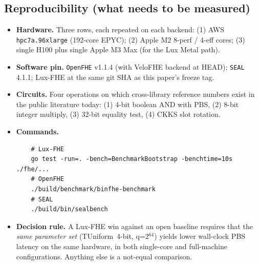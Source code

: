 \subsection{Reproducibility (what needs to be measured)}
\label{sec:fhe-repro}

\begin{itemize}[nosep]
  \item \textbf{Hardware.} Three rows, each repeated on each backend:
        (1) AWS \texttt{hpc7a.96xlarge} (192-core EPYC);
        (2) Apple M2 8-perf / 4-eff cores;
        (3) single H100 plus single Apple M3 Max (for the Lux Metal path).
  \item \textbf{Software pin.} \texttt{OpenFHE} v1.1.4 (with VeloFHE
        backend at HEAD); \texttt{SEAL} 4.1.1; Lux-FHE at the same
        git SHA as this paper's freeze tag.
  \item \textbf{Circuits.} Four operations on which cross-library
        reference numbers exist in the public literature today:
        (1) 4-bit boolean AND with PBS,
        (2) 8-bit integer multiply, (3) 32-bit equality test,
        (4) CKKS slot rotation.
  \item \textbf{Commands.}
  \begin{verbatim}
    # Lux-FHE
    go test -run=. -bench=BenchmarkBootstrap -benchtime=10s ./fhe/...
    # OpenFHE
    ./build/benchmark/binfhe-benchmark
    # SEAL
    ./build/bin/sealbench
  \end{verbatim}
  \item \textbf{Decision rule.} A Lux-FHE win against an open
        baseline requires that the \emph{same parameter set}
        (TUniform~4-bit, q=2$^{64}$) yields lower wall-clock PBS
        latency on the same hardware, in both single-core and
        full-machine configurations. Anything else is a not-equal
        comparison.
\end{itemize}

